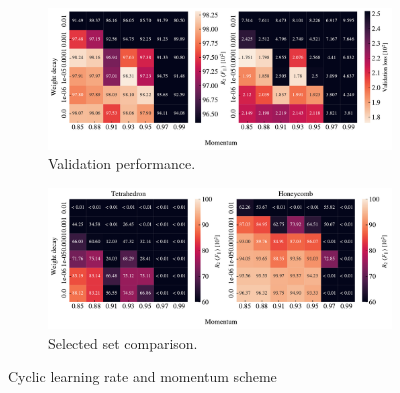 \begin{figure}[H]
  \centering
  \begin{subfigure}[t]{1.0\textwidth}
      \centering
      \includegraphics[width=\textwidth]{figures/ML/mom_weight_search_cyclic_perf.pdf}
      \caption{Validation performance.}
  \end{subfigure}
  \hfill
  \begin{subfigure}[t]{1.0\textwidth}
      \centering
      \includegraphics[width=\textwidth]{figures/ML/mom_weight_search_compare_cyclic_perf.pdf}
      \caption{Selected set comparison.}
  \end{subfigure}
  \hfill
  \caption{Cyclic learning rate and momentum scheme}
  \label{fig:mom_weight_search_cyclic}
\end{figure}


